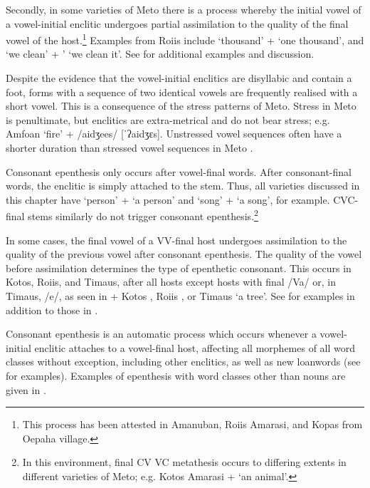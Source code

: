 \documentclass[output=paper]{langscibook}
\begin{document}
Secondly, in some varieties of Meto there is a process
whereby the initial vowel of a vowel-initial enclitic
undergoes partial assimilation to the quality of the
final vowel of the host.\footnote{This process has been attested in Amanuban,
		Roi{\Q}is Amarasi, and Kopas from Oepaha village.}
Examples from Roi{\Q}is include  `thousand' + 
{\ra}  `one thousand',
and  `we clean' +  '
{\ra}  `we clean it'.
See \citet[248--252]{ed20} for additional examples and discussion.

Despite the evidence that the vowel-initial enclitics
are disyllabic and contain a foot, forms with a sequence
of two identical vowels are frequently realised with a short vowel.
This is a consequence of the stress patterns of Meto.
Stress in Meto is penultimate, but enclitics
are extra-metrical and do not bear stress;
e.g. Amfo{\Q}an  `fire' +  {\ra} /aidʒees/ [ˈʔaidʒɛs].
Unstressed vowel sequences often have a shorter duration
than stressed vowel sequences in Meto \citep[98--99]{ed20}.

Consonant epenthesis only occurs after vowel-final words.
After consonant-final words, the enclitic is simply attached to the stem.
Thus, all varieties discussed in this chapter have 
 `person' +  {\ra}  `a person'
and  `song' +  {\ra}  `a song', for example.
CVC-final stems similarly do not trigger consonant epenthesis.\footnote{%
In this environment, final CV {\ra} VC metathesis occurs to differing
extents in different varieties of Meto;
e.g. Kotos Amarasi  +  {\ra}  `an animal'.}

In some cases, the final vowel of a VV-final host undergoes assimilation
to the quality of the previous vowel after consonant epenthesis.
The quality of the vowel before assimilation determines
the type of epenthetic consonant.
This occurs in Kotos, Roi{\Q}is, and Timaus,
after all hosts except hosts with final /Va/ or, in Timaus, /e/,
as seen in  +  {\ra} Kotos ,
Roi{\Q}is , or Timaus  `a tree'.
See  for examples in addition to those in .

Consonant epenthesis is an automatic process which occurs whenever
a vowel-initial enclitic attaches to a vowel-final host,
affecting all morphemes of all word classes without exception,
including other enclitics, as well as new loanwords (see  for examples).
Examples of epenthesis with word classes other
than nouns are given in .
\end{document}
